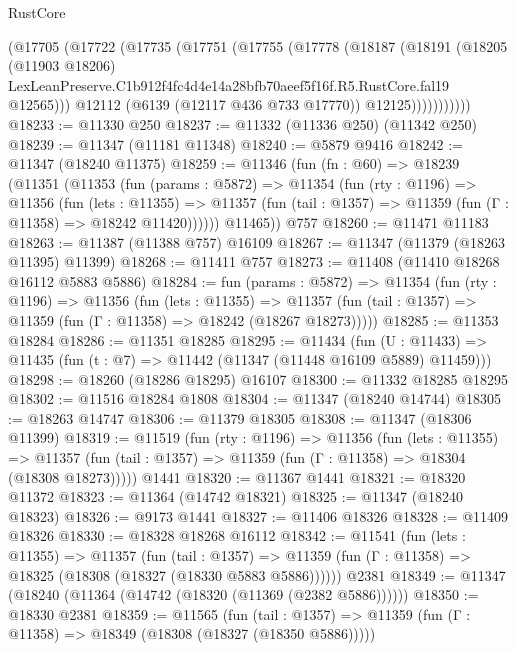 \begin{lexlean}{RustCore}
\begin{coremodule}
              (@17705
                (@17722
                  (@17735
                    (@17751
                      (@17755
                        (@17778
                          (@18187
                            (@18191
                              (@18205
                                (@11903 @18206)
                                LexLeanPreserve.C1b912f4fc4d4e14a28bfb70aeef5f16f.R5.RustCore.fal19
                                @12565)))
                          @12112
                          (@6139 (@12117 @436 @733 @17770))
                          @12125)))))))))))
@18233 := @11330 @250
@18237 := @11332 (@11336 @250) (@11342 @250)
@18239 := @11347 (@11181 @11348)
@18240 := @5879 @9416
@18242 := @11347 (@18240 @11375)
@18259 := @11346
    (fun (fn : @60) =>
    @18239
      (@11351
        (@11353
          (fun (params : @5872) =>
          @11354
            (fun (rty : @1196) =>
            @11356
              (fun (lets : @11355) =>
              @11357 (fun (tail : @1357) => @11359 (fun (Γ : @11358) => @18242 @11420))))))
        @11465))
    @757
@18260 := @11471 @11183
@18263 := @11387 (@11388 @757) @16109
@18267 := @11347 (@11379 (@18263 @11395) @11399)
@18268 := @11411 @757
@18273 := @11408 (@11410 @18268 @16112 @5883 @5886)
@18284 := fun (params : @5872) =>
  @11354
    (fun (rty : @1196) =>
    @11356
      (fun (lets : @11355) =>
      @11357 (fun (tail : @1357) => @11359 (fun (Γ : @11358) => @18242 (@18267 @18273)))))
@18285 := @11353 @18284
@18286 := @11351 @18285
@18295 := @11434
    (fun (U : @11433) => @11435 (fun (t : @7) => @11442 (@11347 (@11448 @16109 @5889) @11459)))
@18298 := @18260 (@18286 @18295) @16107
@18300 := @11332 @18285 @18295
@18302 := @11516 @18284 @1808
@18304 := @11347 (@18240 @14744)
@18305 := @18263 @14747
@18306 := @11379 @18305
@18308 := @11347 (@18306 @11399)
@18319 := @11519
    (fun (rty : @1196) =>
    @11356
      (fun (lets : @11355) =>
      @11357 (fun (tail : @1357) => @11359 (fun (Γ : @11358) => @18304 (@18308 @18273)))))
    @1441
@18320 := @11367 @1441
@18321 := @18320 @11372
@18323 := @11364 (@14742 @18321)
@18325 := @11347 (@18240 @18323)
@18326 := @9173 @1441
@18327 := @11406 @18326
@18328 := @11409 @18326
@18330 := @18328 @18268 @16112
@18342 := @11541
    (fun (lets : @11355) =>
    @11357
      (fun (tail : @1357) =>
      @11359 (fun (Γ : @11358) => @18325 (@18308 (@18327 (@18330 @5883 @5886))))))
    @2381
@18349 := @11347 (@18240 (@11364 (@14742 (@18320 (@11369 (@2382 @5886))))))
@18350 := @18330 @2381
@18359 := @11565
    (fun (tail : @1357) => @11359 (fun (Γ : @11358) => @18349 (@18308 (@18327 (@18350 @5886)))))

\end{coremodule}
\end{lexlean}
